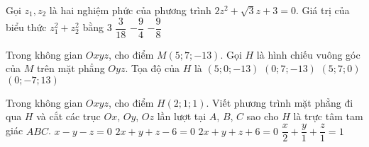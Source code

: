 \begin{ex}%
	Gọi $z_1,z_2$ là hai nghiệm phức của phương trình $2z^2+\sqrt{3}z+3=0$. Giá trị của biểu thức $z_1^2+z_2^2$ bằng
	\choice
	{3}
	{$\dfrac{3}{18}$}
	{\True $-\dfrac{9}{4}$}
	{$-\dfrac{9}{8}$}
\end{ex}

\begin{ex}%
	Trong không gian $Oxyz$, cho điểm $M(5;7;-13)$. Gọi $H$ là hình chiếu vuông góc của $M$ trên mặt phẳng $Oyz$. Tọa độ của $H$ là
	\choice
	{$(5;0;-13)$}
	{\True $(0;7;-13)$}
	{$(5;7;0)$}
	{$(0;-7;13)$}
\end{ex}

\begin{ex}%
	Trong không gian $Oxyz$, cho điểm $H(2;1;1)$. Viết phương trình mặt phẳng đi qua $H$ và cắt các trục $Ox$, $Oy$, $Oz$ lần lượt tại $A$, $B$, $C$ sao cho $H$ là trực tâm tam giác $ABC$.
	\choice
	{$x-y-z=0$}
	{\True $2x+y+z-6=0$}
	{$2x+y+z+6=0$}
	{$\dfrac{x}{2}+\dfrac{y}{1}+\dfrac{z}{1}=1$}
\end{ex}

